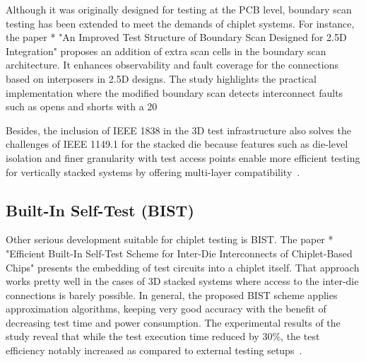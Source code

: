\documentclass[acmtog, 12pt]{acmart}
\begin{document}


Although it was originally designed for testing at the PCB level, boundary scan testing has been extended to meet the demands of chiplet systems. For instance, the paper * "An Improved Test Structure of Boundary Scan Designed for 2.5D Integration" proposes an addition of extra scan cells in the boundary scan architecture. It enhances observability and fault coverage for the connections based on interposers in 2.5D designs. The study highlights the practical implementation where the modified boundary scan detects interconnect faults such as opens and shorts with a 20%

Besides, the inclusion of IEEE 1838 in the 3D test infrastructure also solves the challenges of IEEE 1149.1 for the stacked die because features such as die-level isolation and finer granularity with test access points enable more efficient testing for vertically stacked systems by offering multi-layer compatibility~\cite{6515989}.


\subsection*{Built-In Self-Test (BIST)}

Other serious development suitable for chiplet testing is BIST. The paper * "Efficient Built-In Self-Test Scheme for Inter-Die Interconnects of Chiplet-Based Chips" presents the embedding of test circuits into a chiplet itself. That approach works pretty well in the cases of 3D stacked systems where access to the inter-die connections is barely possible. In general, the proposed BIST scheme applies approximation algorithms, keeping very good accuracy with the benefit of decreasing test time and power consumption. The experimental results of the study reveal that while the test execution time reduced by 30\%, the test efficiency notably increased as compared to external testing setups~\cite{10766679}.
\end{document}
